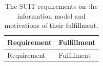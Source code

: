 \documentclass[0-thesis.tex]{subfiles}
\begin{document}
\begin{small}
\begin{longtable}[]{@{}ll@{}}
    \caption{The SUIT requirements on the information model and motivations of their fulfillment.}
    \label{tab:information-evaluation}\\
    \toprule
    \begin{minipage}[b]{0.37\columnwidth}\raggedright\strut
    Requirement\strut
    \end{minipage} & \begin{minipage}[b]{0.57\columnwidth}\raggedright\strut
    Fulfillment\strut
    \end{minipage}\tabularnewline
    \midrule
    \endfirsthead
    \toprule
    \begin{minipage}[b]{0.37\columnwidth}\raggedright\strut
    Requirement\strut
    \end{minipage} & \begin{minipage}[b]{0.57\columnwidth}\raggedright\strut
    Fulfillment\strut
    \end{minipage}\tabularnewline
    \midrule
    \endhead


\end{longtable}
\end{small}
\end{document}

